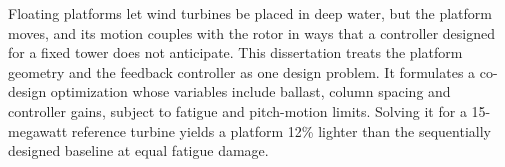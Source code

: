 Floating platforms let wind turbines be placed in deep water, but the platform moves, and its
motion couples with the rotor in ways that a controller designed for a fixed tower does not
anticipate. This dissertation treats the platform geometry and the feedback controller as one
design problem. It formulates a co-design optimization whose variables include ballast, column
spacing and controller gains, subject to fatigue and pitch-motion limits. Solving it for a
15-megawatt reference turbine yields a platform 12\% lighter than the sequentially designed
baseline at equal fatigue damage.
